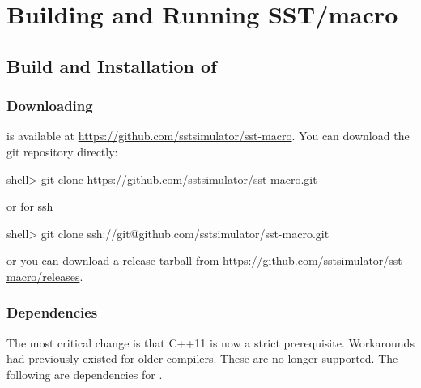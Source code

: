 
\chapter{Building and Running SST/macro}
\label{chapter:building}

\section{Build and Installation of \sstmacro}
\label{sec:buildinstall}


\subsection{Downloading}
\label{subsec:build:downloading}

\sstmacro is available at \url{https://github.com/sstsimulator/sst-macro}.
You can download the git repository directly:

\begin{ShellCmd}
shell> git clone https://github.com/sstsimulator/sst-macro.git 
\end{ShellCmd}
or for ssh

\begin{ShellCmd}
shell> git clone ssh://git@github.com/sstsimulator/sst-macro.git 
\end{ShellCmd}
or you can download a release tarball from \url{https://github.com/sstsimulator/sst-macro/releases}.

\subsection{Dependencies}
\label{subsec:build:dependencies}
The most critical change is that C++11 is now a strict prerequisite. 
Workarounds had previously existed for older compilers. 
These are no longer supported.
The following are dependencies for \sstmacro.

